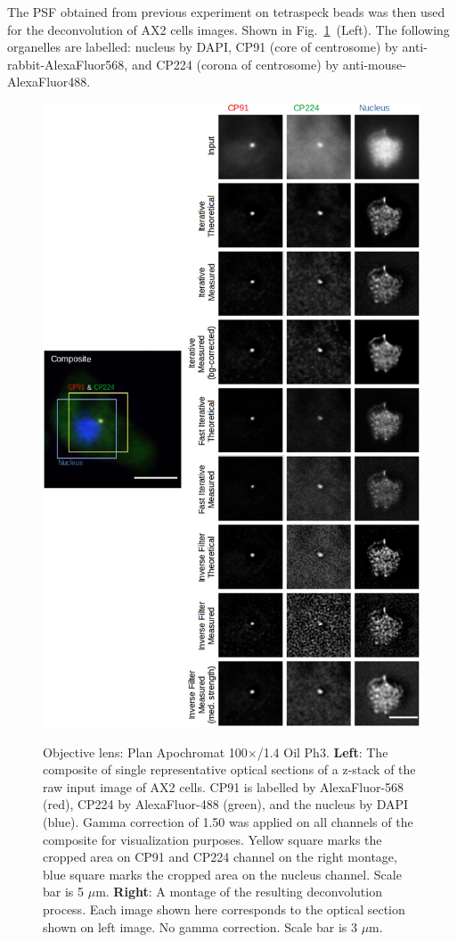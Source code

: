 The PSF obtained from previous experiment on tetraspeck beads was then used for the deconvolution of AX2 cells images. Shown in Fig.~\ref{fig:ax2mon}~(Left). 
The following organelles are labelled: nucleus by DAPI, CP91 (core of centrosome) by anti-rabbit-AlexaFluor568, and CP224 (corona of centrosome) by anti-mouse-AlexaFluor488.

\begin{figure}
\centering
\includegraphics[height=0.85\textheight]{Exp_7_Deconvolution/Figures/montagemerged3t}\\
\caption{Objective lens: Plan Apochromat 100$\times$/1.4 Oil Ph3. \textbf{Left}: The composite of single representative optical sections of a z-stack of the raw input image of AX2 cells. CP91 is labelled by AlexaFluor-568 (red), CP224 by AlexaFluor-488 (green), and the nucleus by DAPI (blue). 
Gamma correction of 1.50 was applied on all channels of the composite for visualization purposes. 
Yellow square marks the cropped area on CP91 and CP224 channel on the right montage, blue square marks the cropped area on the nucleus channel. 
Scale bar is 5 $\mu$m. \textbf{Right}: A montage of the resulting deconvolution process. 
Each image shown here corresponds to the optical section shown on left image. 
No gamma correction. 
Scale bar is 3 $\mu$m.}
\label{fig:ax2mon}
\end{figure}


